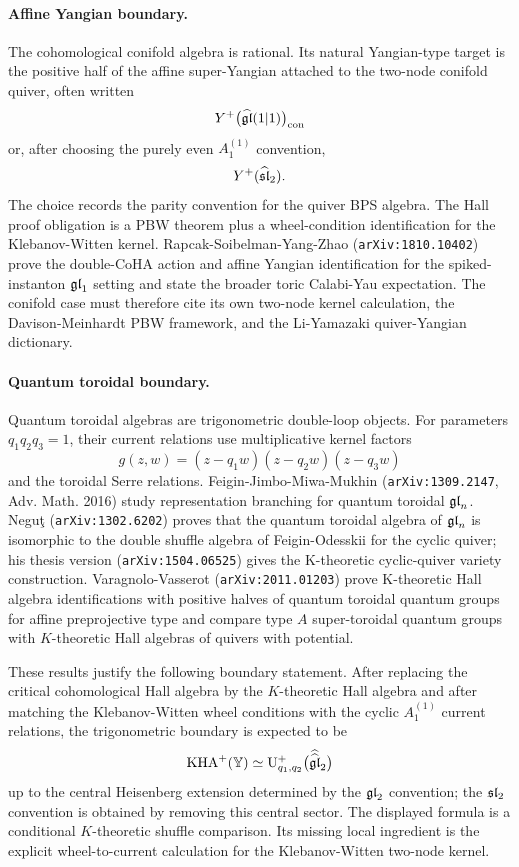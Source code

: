 \paragraph{Affine Yangian boundary.}
The cohomological conifold algebra is rational.  Its natural
Yangian-type target is the positive half of the affine super-Yangian
attached to the two-node conifold quiver, often written
\[
  Y^+\bigl(\widehat{\mathfrak{gl}}(1|1)\bigr)_{\mathrm{con}}
\]
or, after choosing the purely even \(A_1^{(1)}\) convention,
\[
  Y^+(\widehat{\mathfrak{sl}}_2).
\]
The choice records the parity convention for the quiver BPS algebra.
The Hall proof obligation is a PBW theorem plus a wheel-condition
identification for the Klebanov-Witten kernel.  Rapcak-Soibelman-Yang-Zhao
(\texttt{arXiv:1810.10402}) prove the double-CoHA action and affine
Yangian identification for the spiked-instanton \(\mathfrak{gl}_1\) setting and
state the broader toric Calabi-Yau expectation.  The conifold case must
therefore cite its own two-node kernel calculation, the Davison-Meinhardt
PBW framework, and the Li-Yamazaki quiver-Yangian dictionary.

\paragraph{Quantum toroidal boundary.}
Quantum toroidal algebras are trigonometric double-loop objects.  For
parameters \(q_1q_2q_3=1\), their current relations use multiplicative
kernel factors
\[
  g(z,w)=(z-q_1w)(z-q_2w)(z-q_3w)
\]
and the toroidal Serre relations.  Feigin-Jimbo-Miwa-Mukhin
(\texttt{arXiv:1309.2147}, Adv. Math. 2016) study representation
branching for quantum toroidal \(\mathfrak{gl}_n\).  Negu\c{t}
(\texttt{arXiv:1302.6202}) proves that the quantum toroidal algebra of
\(\mathfrak{gl}_n\) is isomorphic to the double shuffle algebra of Feigin-Odesskii
for the cyclic quiver; his thesis version
(\texttt{arXiv:1504.06525}) gives the K-theoretic cyclic-quiver
variety construction.  Varagnolo-Vasserot
(\texttt{arXiv:2011.01203}) prove K-theoretic Hall algebra
identifications with positive halves of quantum toroidal quantum groups
for affine preprojective type and compare type \(A\) super-toroidal
quantum groups with \(K\)-theoretic Hall algebras of quivers with
potential.

These results justify the following boundary statement.  After replacing
the critical cohomological Hall algebra by the \(K\)-theoretic Hall
algebra and after matching the Klebanov-Witten wheel conditions with
the cyclic \(A_1^{(1)}\) current relations, the trigonometric boundary
is expected to be
\[
  \mathrm{KHA}^+(\mathbb{Y})
  \simeq
  \mathrm{U}^+_{q_1,q_2}
  \bigl(\widehat{\widehat{\mathfrak{gl}}}_2\bigr)
\]
up to the central Heisenberg extension determined by the \(\mathfrak{gl}_2\)
convention; the \(\mathfrak{sl}_2\) convention is obtained by removing this
central sector.  The displayed formula is a conditional
\(K\)-theoretic shuffle comparison.  Its missing local ingredient is
the explicit wheel-to-current calculation for the Klebanov-Witten
two-node kernel.

